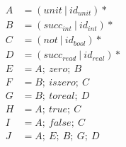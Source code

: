 \documentclass{article}
\begin{document}
\begin{enumerate}
  \begin{align*}
    A &= (unit~|~id_{unit})*
  \\B &= (succ_{int}~|~id_{int})*
  \\C &= (not~|~id_{bool})*
  \\D &= (succ_{read}~|~id_{real})*
  \\E &= A;~zero;~B
  \\F &= B;~iszero;~C
  \\G &= B;~toreal;~D
  \\H &= A;~true;~C
  \\I &= A;~false;~C
  \\J &= A;~E;~B;~G;~D
  \end{align*}
      
\end{enumerate}
\end{document}
